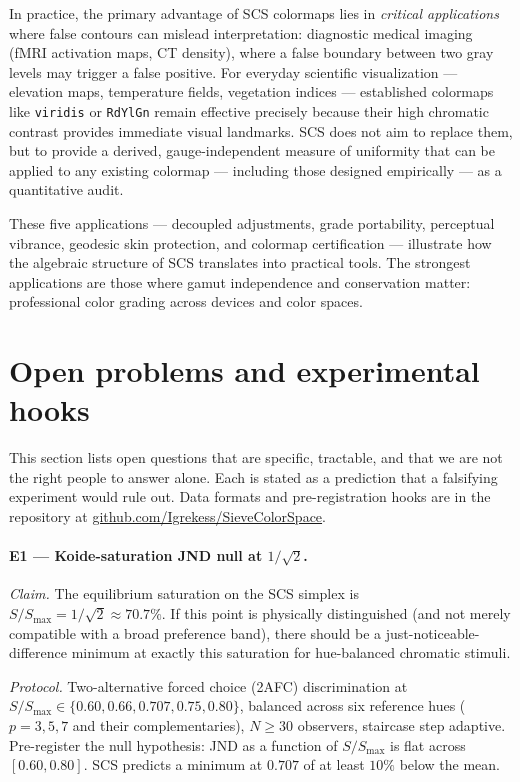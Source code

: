 \documentclass[12pt,a4paper]{article}
\begin{document}
In practice, the primary advantage of SCS colormaps lies in
\emph{critical applications} where false contours can mislead
interpretation: diagnostic medical imaging (fMRI activation maps,
CT density), where a false boundary between two gray levels may
trigger a false positive. For everyday scientific visualization ---
elevation maps, temperature fields, vegetation indices --- established
colormaps like \texttt{viridis} or \texttt{RdYlGn} remain effective
precisely because their high chromatic contrast provides immediate
visual landmarks. SCS does not aim to replace them, but to provide
a derived, gauge-independent measure of uniformity that can be applied
to any existing colormap --- including those designed empirically ---
as a quantitative audit.

\medskip

These five applications --- decoupled adjustments, grade portability,
perceptual vibrance, geodesic skin protection, and colormap
certification --- illustrate how the algebraic structure of SCS
translates into practical tools. The strongest applications are those
where gamut independence and conservation matter: professional color
grading across devices and color spaces.

\section{Open problems and experimental hooks}
\label{sec:open_problems}

This section lists open questions that are specific, tractable, and
that we are not the right people to answer alone. Each is stated as
a prediction that a falsifying experiment would rule out. Data
formats and pre-registration hooks are in the repository at
\href{https://github.com/Igrekess/SieveColorSpace}{github.com/Igrekess/SieveColorSpace}.

\paragraph{E1 --- Koide-saturation JND null at $1/\sqrt{2}$.}
\emph{Claim.} The equilibrium saturation on the SCS simplex is
$S/S_{\max} = 1/\sqrt{2} \approx 70.7\%$. If this point is physically
distinguished (and not merely compatible with a broad preference
band), there should be a just-noticeable-difference minimum at exactly
this saturation for hue-balanced chromatic stimuli.

\emph{Protocol.} Two-alternative forced choice (2AFC) discrimination
at $S/S_{\max} \in \{0.60, 0.66, 0.707, 0.75, 0.80\}$, balanced
across six reference hues ($p=3, 5, 7$ and their complementaries),
$N \geq 30$ observers, staircase step adaptive. Pre-register the null
hypothesis: JND as a function of $S/S_{\max}$ is flat across
$[0.60, 0.80]$. SCS predicts a minimum at $0.707$ of at least $10\%$
below the mean.
\end{document}
